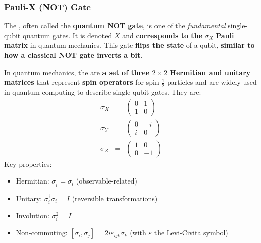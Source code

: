 \subsubsection{Pauli-X (NOT) Gate}

The , often called the \textbf{quantum NOT gate}, is one of the \emph{fundamental} single-qubit quantum gates. It is denoted $X$ and \textbf{corresponds to the} $\sigma_{X}$ \textbf{Pauli matrix} in quantum mechanics. This gate \textbf{flips the state} of a qubit, \textbf{similar to how a classical NOT gate inverts a bit}.

\highspace
\begin{remarkbox}
   In quantum mechanics, the  are \textbf{a set of three $2 \times 2$ Hermitian and unitary matrices} that represent \textbf{spin operators} for spin-$\frac{1}{2}$ particles and are widely used in quantum computing to describe single-qubit gates. They are:
   \begin{equation*}
      \begin{array}{rcl}
         \sigma_{X} &=&
         \begin{pmatrix}
            0 & 1 \\
            1 & 0
         \end{pmatrix} \\ [1em]
         \sigma_{Y} &=&
         \begin{pmatrix}
            0 & -i \\
            i & 0
         \end{pmatrix} \\ [1em]
         \sigma_{Z} &=&
         \begin{pmatrix}
            1 & 0 \\
            0 & -1
         \end{pmatrix}
      \end{array}
   \end{equation*}
   Key properties:
   \begin{itemize}
      \item Hermitian: $\sigma_{i}^{\dagger} = \sigma_{i}$ (observable-related)
      \item Unitary: $\sigma_{i}^{\dagger} \sigma_{i} = I$ (reversible transformations)
      \item Involution: $\sigma_{i}^{2} = I$
      \item Non-commuting: $\left[\sigma_{i}, \sigma_{j}\right] = 2i \varepsilon_{ijk} \sigma_{k}$ (with $\varepsilon$ the Levi-Civita symbol)
   \end{itemize}
\end{remarkbox}

